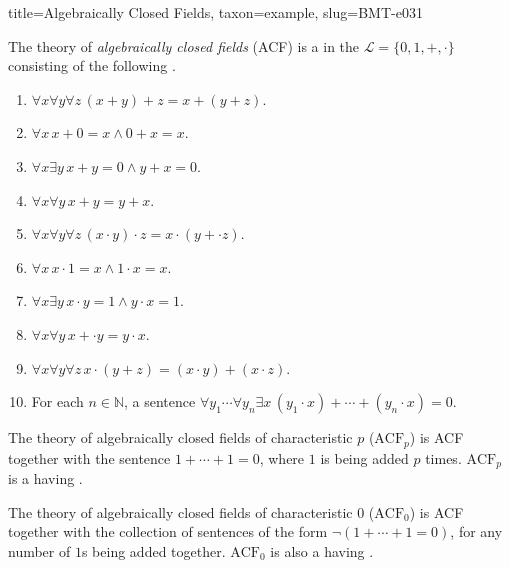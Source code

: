 \documentclass[a4paper]{article}
\begin{document}
\begin{tree}{title={Algebraically Closed Fields}, taxon={example}, slug={BMT-e031}}

    The theory of \emph{algebraically closed fields} (ACF) is a  in the  \(\mathcal  L= \{ 0,1,+, \cdot \}\)
    consisting of the following .
    \begin{enumerate}
\item{\(\forall  x \forall  y \forall  z \, (x+y)+z=x+(y+z)\).
        }
        \item{\(\forall  x \, x+0=x \land0 +x=x\).
        }
        \item{\(\forall  x \exists  y \, x+y=0 \land  y+x=0\).
        }
        \item{\(\forall  x \forall  y \, x+y=y+x\).
        }
        \item{\(\forall  x \forall  y \forall  z \, (x \cdot  y) \cdot  z=x \cdot  (y+ \cdot  z)\).
        }
        \item{\(\forall  x \, x \cdot1 =x \land1 \cdot  x=x\).
        }
        \item{\(\forall  x \exists  y \, x \cdot  y=1 \land  y \cdot  x=1\).
        }
        \item{\(\forall  x \forall  y \, x+ \cdot  y=y \cdot  x\).
        }
        \item{\(\forall  x \forall  y \forall  z \, x \cdot (y+z)=(x \cdot  y)+(x \cdot  z)\).
        }
        \item{
            For each \(n \in \mathbb  N\), a sentence \(\forall  y_1 \cdots \forall  y_n \exists  x \, (y_1 \cdot  x)+ \cdots +(y_n \cdot  x)=0\).
        }
\end{enumerate}\par{
    The theory of algebraically closed fields of characteristic \(p\) (\(\text {ACF}_p\)) is ACF together with the sentence
    \(1+ \cdots +1=0\), where \(1\) is being added \(p\) times. \(\text {ACF}_p\) is a  having
    .
}\par{
    The theory of algebraically closed fields of characteristic \(0\) (\(\text {ACF}_0\)) is ACF together with the collection of sentences
    of the form \(\neg (1+ \cdots +1=0)\), for any number of \(1\)s being added together. \(\text {ACF}_0\) is also a
     having .
}
\end{tree}

\printbibliography
\end{document}
